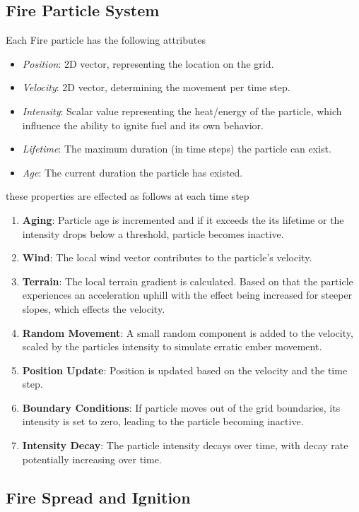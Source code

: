 \subsection{Fire Particle System}
Each Fire particle has the following attributes
\begin{itemize}
	\item \textit{Position}: 2D vector, representing the location on the grid.
	\item \textit{Velocity}: 2D vector, determining  the movement per time step.
	\item \textit{Intensity}: Scalar value representing the heat/energy of the particle, which influence the ability to ignite fuel and its own behavior.
	\item \textit{Lifetime}: The maximum duration (in time steps) the particle can exist.
	\item \textit{Age}: The current duration the particle has existed.
\end{itemize}
these properties are effected as follows at each time step
\begin{enumerate}
	\item \textbf{Aging}: Particle age is incremented and if it exceeds the its lifetime or the intensity drops below a threshold, particle becomes inactive.
	\item \textbf{Wind}: The local wind vector contributes to the particle's velocity.
	\item \textbf{Terrain}: The local terrain gradient is calculated. Based on that the particle experiences an acceleration uphill with the effect being increased for steeper slopes, which effects the velocity.
	\item \textbf{Random Movement}: A small random component is added to the velocity, scaled by the particles intensity to simulate erratic ember movement.
	\item \textbf{Position Update}: Position is updated based on the velocity and the time step.
	\item \textbf{Boundary Conditions}: If particle moves out of the grid boundaries, its intensity is set to zero, leading to the particle becoming inactive.
	\item \textbf{Intensity Decay}: The particle intensity decays over time, with decay rate potentially increasing over time.
\end{enumerate}

\subsection{Fire Spread and Ignition}
